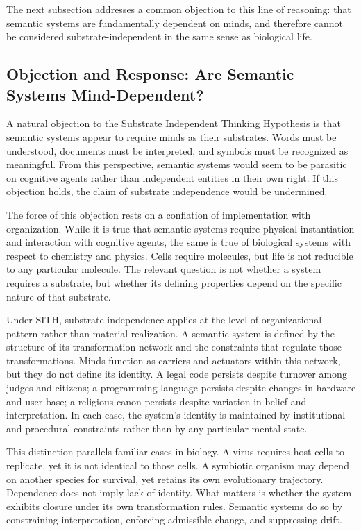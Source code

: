 \documentclass[11pt,oneside]{article}
\begin{document}
The next subsection addresses a common objection to this line of reasoning: that semantic systems are fundamentally dependent on minds, and therefore cannot be considered substrate-independent in the same sense as biological life.

\subsection{Objection and Response: Are Semantic Systems Mind-Dependent?} 

A natural objection to the Substrate Independent Thinking Hypothesis is that semantic systems appear to require minds as their substrates. Words must be understood, documents must be interpreted, and symbols must be recognized as meaningful. From this perspective, semantic systems would seem to be parasitic on cognitive agents rather than independent entities in their own right. If this objection holds, the claim of substrate independence would be undermined.

The force of this objection rests on a conflation of implementation with organization. While it is true that semantic systems require physical instantiation and interaction with cognitive agents, the same is true of biological systems with respect to chemistry and physics. Cells require molecules, but life is not reducible to any particular molecule. The relevant question is not whether a system requires a substrate, but whether its defining properties depend on the specific nature of that substrate.

Under SITH, substrate independence applies at the level of organizational pattern rather than material realization. A semantic system is defined by the structure of its transformation network and the constraints that regulate those transformations. Minds function as carriers and actuators within this network, but they do not define its identity. A legal code persists despite turnover among judges and citizens; a programming language persists despite changes in hardware and user base; a religious canon persists despite variation in belief and interpretation. In each case, the system’s identity is maintained by institutional and procedural constraints rather than by any particular mental state.

This distinction parallels familiar cases in biology. A virus requires host cells to replicate, yet it is not identical to those cells. A symbiotic organism may depend on another species for survival, yet retains its own evolutionary trajectory. Dependence does not imply lack of identity. What matters is whether the system exhibits closure under its own transformation rules. Semantic systems do so by constraining interpretation, enforcing admissible change, and suppressing drift.
\end{document}
